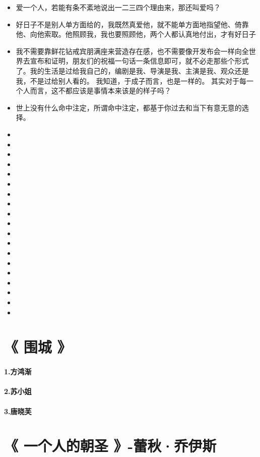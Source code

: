 \documentclass[UTF8,a4paper,8pt]{ctexart}
\begin{document}
\begin{itemize}
 	\item 爱一个人，若能有条不紊地说出一二三四个理由来，那还叫爱吗？
 	\item 好日子不是别人单方面给的，我既然真爱他，就不能单方面地指望他、倚靠他、向他索取。他照顾我，我也要照顾他，两个人都认真地付出，才有好日子
 	\item 我不需要靠鲜花钻戒宾朋满座来营造存在感，也不需要像开发布会一样向全世界去宣布和证明，朋友们的祝福一句话一条信息即可，就不必走那些个形式了。我的生活是过给我自己的，编剧是我、导演是我、主演是我、观众还是我，不是过给别人看的。 我知道，于成子而言，也是一样的。 其实对于每一个人而言，这不都应该是事情本来该是的样子吗？
 	\item 世上没有什么命中注定，所谓命中注定，都基于你过去和当下有意无意的选择。
 	\item
 	\item 
 	\item 
 	\item 
 	\item 
 	\item 
 	\item 
 	\item
 	\item 
 	\item 
 	\item 
 	\item 
 	\item 
 	\item 
 	\item
 	\item 
 	\item 
 	\item 
 	\item 
 \end{itemize}
 
 \newpage			
 \section{《 围城 》 }  			
 \paragraph{1.方鸿渐}
 \paragraph{2.苏小姐}
 \paragraph{3.唐晓芙}
 
 \newpage			
 \section{《 一个人的朝圣 》-蕾秋·乔伊斯 }
\end{document}
